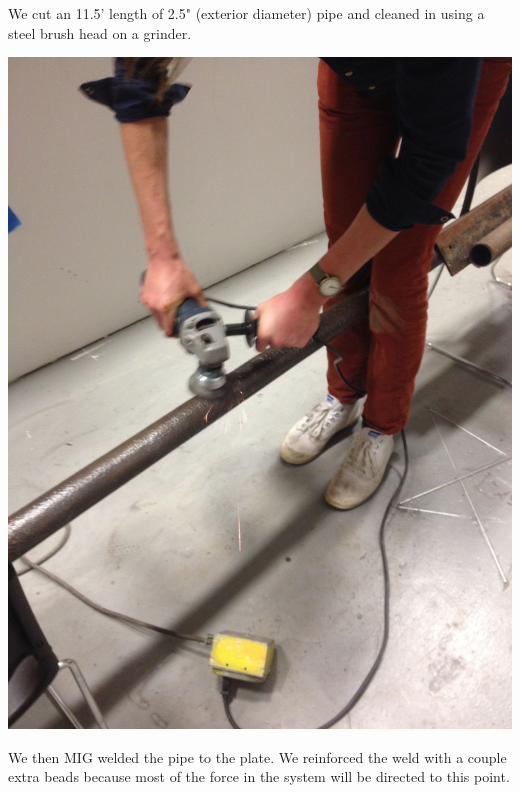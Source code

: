 \documentclass[11pt]{article} %
\begin{document}
We cut an 11.5' length of 2.5" (exterior diameter) pipe and cleaned in using a steel brush head on a grinder.

\begin{center}
\includegraphics[scale=0.12]{roofmount/03.jpeg}
\end{center}


We then MIG welded the pipe to the plate. We reinforced the weld with a couple extra beads because most of the force in the system will be directed to this point.
\end{document}
